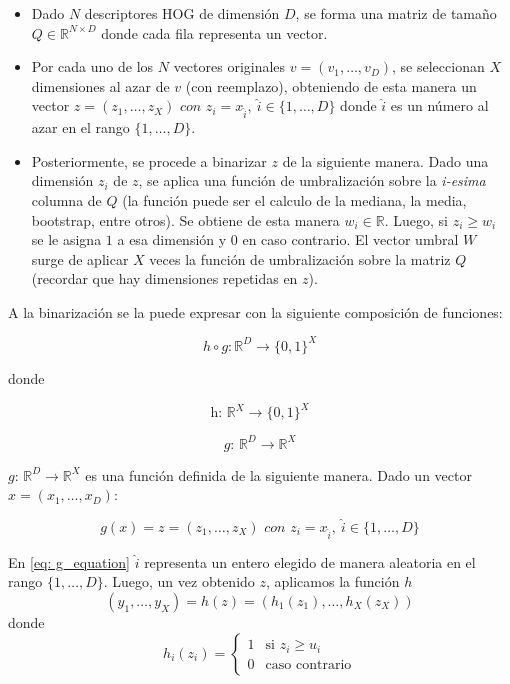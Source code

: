 		\begin{itemize}
		
			\item Dado $N$ descriptores HOG de dimensión $D$, se forma una matriz de tamaño $Q \in \mathbb{R}^{N \times D}$ donde cada fila representa un vector.
			\item Por cada uno de los $N$ vectores originales $v=(v_1,\dots,v_D)$, se seleccionan $X$ dimensiones al azar de $v$ (con reemplazo), obteniendo de esta manera un vector $z = (z_1,\dots,z_X) \textit{ con } z_i=x_{\hat{i}},~\hat{i} \in \{1,\dots,D\}$ donde $\hat{i}$ es un número al azar en el rango $\{1,\dots,D\}$.
			\item Posteriormente, se procede a binarizar $z$ de la siguiente manera. Dado una dimensión $z_i$ de $z$, se aplica una función de umbralización sobre la \textit{i-esima} columna de $Q$ (la función puede ser el calculo de la mediana, la media, bootstrap, entre otros). Se obtiene de esta manera $w_i \in \mathbb{R}$. Luego, si $z_i \geq w_i$ se le asigna $1$ a esa dimensión y $0$ en caso contrario. El vector umbral $W$ surge de aplicar $X$ veces la función de umbralización sobre la matriz $Q$ (recordar que hay dimensiones repetidas en $z$).
						
		\end{itemize}
	
	A la binarización se la puede expresar con la siguiente composición de funciones:
	
	$$h \circ g:\mathbb{R}^{D} \rightarrow \{ 0, 1\}^{X}$$
	
	donde
	
	$$\textit{h: }\mathbb{R}^{X} \rightarrow \{ 0, 1\}^{X}$$
	
	$$\textit{g: }\mathbb{R}^{D} \rightarrow \mathbb{R}^{X}$$
	
	
	$\textit{g: }\mathbb{R}^{D} \rightarrow \mathbb{R}^{X}$ es una función definida de la siguiente manera. Dado un vector  $x=(x_1, \dots, x_D)$:

	\begin{equation}
	\label{eq: g_equation}
		g(x) = z = (z_1,\dots,z_X) \textit{ con } z_i=x_{\hat{i}},~\hat{i} \in \{1,\dots,D\}
	\end{equation}		
	
	En \ref{eq: g_equation} $\hat{i}$ representa un entero elegido de manera aleatoria en el rango $\{1,\dots,D\}$. Luego, un vez obtenido $z$, aplicamos la función $h$
	\begin{equation}
	\label{eq: h_equation}
		(y_1,\dots,y_X) = h(z) = (h_1(z_1),\dots,h_X(z_X))
	\end{equation}
	donde
	\[
    		h_{i}(z_i) = 
		\begin{cases}
    			1 & \text{si } z_i \geq u_{i}\\
    			0 & \text{caso contrario}
		\end{cases}
	\]

